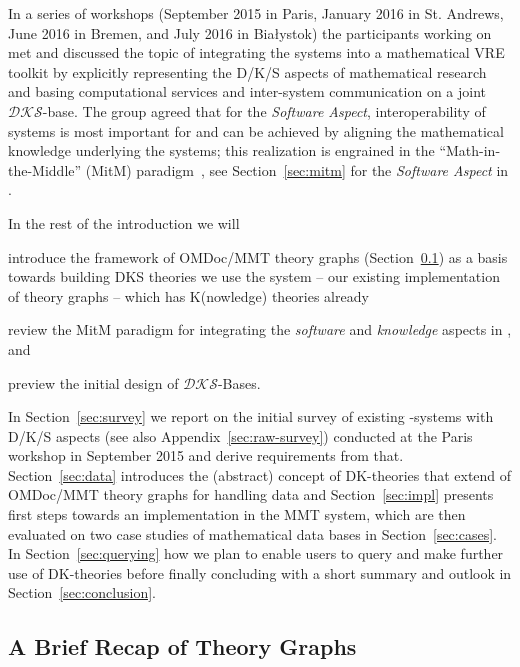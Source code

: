 In a series of workshops (September 2015 in Paris, January 2016 in St. Andrews, June 2016
in Bremen, and July 2016 in Bia{\l}ystok) the participants working on  met
and discussed the topic of integrating the \pn systems into a mathematical VRE toolkit by
explicitly representing the D/K/S aspects of mathematical research and basing
computational services and inter-system communication on a joint $\mathcal{DKS}$-base. The
group agreed that for the \emph{Software Aspect}, interoperability of systems is most
important for \pn and can be achieved by aligning the mathematical knowledge underlying
the systems; this realization is engrained in the ``Math-in-the-Middle'' (MitM)
paradigm~\cite{DehKohKon:iop16}, see Section~\ref{sec:mitm} for the \emph{Software Aspect}
in \pn.

In the rest of the introduction we will 
\begin{compactenum}
\item introduce the framework of OMDoc/MMT theory graphs (Section~\ref{sec:MMT}) as a
  basis towards building DKS theories we use the \MMT system -- our existing
  implementation of theory graphs -- which has K(nowledge) theories already 
\item review the MitM paradigm for integrating the \emph{software} and \emph{knowledge}
  aspects in \pn, and
\item preview the initial design of $\mathcal{DKS}$-Bases.
\end{compactenum}
In Section~\ref{sec:survey} we report on the initial survey of existing \pn-systems with
D/K/S aspects (see also Appendix~\ref{sec:raw-survey}) conducted at the Paris workshop in
September 2015 and derive requirements from that.  Section~\ref{sec:data} introduces the
(abstract) concept of DK-theories that extend of OMDoc/MMT theory graphs for handling data
and Section~\ref{sec:impl} presents first steps towards an implementation in the MMT
system, which are then evaluated on two case studies of mathematical data bases in
Section~\ref{sec:cases}. In Section~\ref{sec:querying} how we plan to enable users to
query and make further use of DK-theories before finally concluding with a short summary
and outlook in Section~\ref{sec:conclusion}.

\subsection{A Brief Recap of Theory Graphs}\label{sec:MMT}

